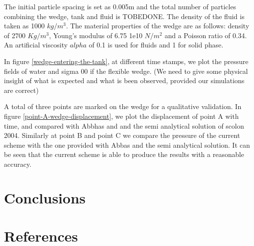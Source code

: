 \documentclass[preprint,12pt]{elsarticle}
\begin{document}
The initial particle spacing is set as 0.005m and the total number of
particles combining the wedge, tank and fluid is TOBEDONE. The density of the
fluid is taken as 1000 $kg/m^3$. The material properties of the wedge are as
follows: density of 2700 $Kg/m^3$, Young's modulus of 6.75 1e10 $N/m^2$ and a
Poisson ratio of 0.34. An artificial viscosity $alpha$ of 0.1 is used for
fluids and 1 for solid phase.

In figure \ref{wedge-entering-the-tank}, at different time stamps, we plot the
pressure fields of water and sigma 00 if the flexible wedge. (We need to give
some physical insight of what is expected and what is been observed, provided
our simulations are correct)



A total of three points are marked on the wedge for a qualitative validation.
In figure \ref{point-A-wedge-displacement}, we plot the displacement of point
A with time, and compared with Abbhas and and the semi analytical solution of
scolon 2004. Similarly at point B and point C we compare the pressure of the
current scheme with the one provided with Abbas and the semi analytical
solution. It can be seen that the current scheme is able to produce the
results with a reasonable accuracy.







\section{Conclusions}
\label{sec:conclusions}


\section*{References}


\end{document}
